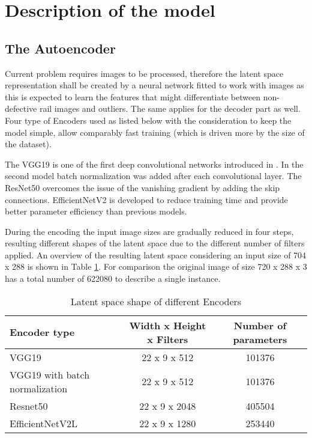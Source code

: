 \section{Description of the model} \label{model}
\subsection{The Autoencoder}
Current problem requires images to be processed, therefore the latent space representation
shall be created by a neural network fitted to work with images as this is expected to learn
the features that might differentiate between non-defective rail images and outliers.
The same applies for the decoder part as well.
Four type of Encoders used as listed below with the consideration to keep the model simple,
allow comparably fast training (which is driven more by the size of the dataset).

The VGG19 is one of the first deep convolutional networks introduced in \cite{simonyan_very_2015}.
In the second model batch normalization was added after each convolutional layer.
The ResNet50 \cite{he_deep_2015} overcomes the issue of the vanishing gradient
by adding the skip connections.
EfficientNetV2 \cite{tan_efficientnetv2_2021} is developed to reduce training time
and provide better parameter efficiency than previous models.

During the encoding the input image sizes are gradually reduced in four steps,
resulting different shapes of the latent space due to the different number of filters applied.
An overview of the resulting latent space considering an input size of 704 x 288
is shown in Table \ref{table:latent_space_shape}.
For comparison the original image of size 720 x 288 x 3 has a total number of 622080 to describe
a single instance.

\begin{table}[!ht]
    \centering
    \begin{tabular}{l c c}
        Encoder type                   & Width x Height x Filters & Number of parameters \\
        \hline
        VGG19                          & 22 x 9 x 512             & 101376               \\
        VGG19 with batch normalization & 22 x 9 x 512             & 101376               \\
        Resnet50                       & 22 x 9 x 2048            & 405504               \\
        EfficientNetV2L                & 22 x 9 x 1280            & 253440               \\
    \end{tabular}
    \caption{Latent space shape of different Encoders}
    \label{table:latent_space_shape}
\end{table}

